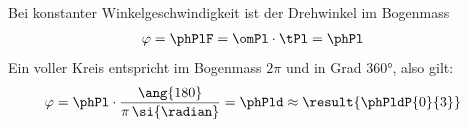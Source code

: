 Bei konstanter Winkelgeschwindigkeit ist der Drehwinkel im Bogenmass
\begin{align}
 \varphi &= \phPlF = \omPl\cdot\tPl = \phPl
\end{align}
Ein voller Kreis entspricht im Bogenmass $2\pi$ und in Grad \ang{360}, also gilt:
\begin{align}
 \varphi &= \phPl\cdot\frac{\ang{180}}{\pi\,\si{\radian}} = \phPld \approx \result{\phPldP{0}{3}}
\end{align}
